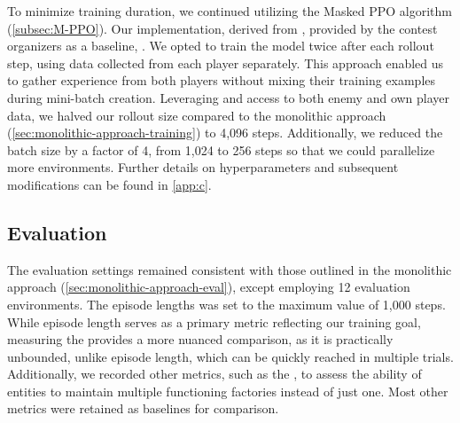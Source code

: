 \noindent To minimize training duration, we continued utilizing the Masked PPO algorithm (\autoref{subsec:M-PPO}). Our implementation, derived from \cite{luxai_s2-baseline-source}, provided by the contest organizers as a baseline, . We opted to train the model twice after each rollout step, using data collected from each player separately. This approach enabled us to gather experience from both players without mixing their training examples during mini-batch creation. Leveraging  and access to both enemy and own player data, we halved our rollout size compared to the monolithic approach (\autoref{sec:monolithic-approach-training}) to 4,096 steps. Additionally, we reduced the batch size by a factor of 4, from 1,024 to 256 steps so that we could parallelize more environments. Further details on hyperparameters and subsequent modifications can be found in \autoref{app:c}.

\subsection{Evaluation} \label{sec:hybrid-metrics}

\noindent The evaluation settings remained consistent with those outlined in the monolithic approach (\autoref{sec:monolithic-approach-eval}), except employing 12 evaluation environments. The episode lengths was set to the maximum value of 1,000 steps. While episode length serves as a primary metric reflecting our training goal, measuring the  provides a more nuanced comparison, as it is practically unbounded, unlike episode length, which can be quickly reached in multiple trials. Additionally, we recorded other metrics, such as the , to assess the ability of entities to maintain multiple functioning factories instead of just one. Most other metrics were retained as baselines for comparison.
